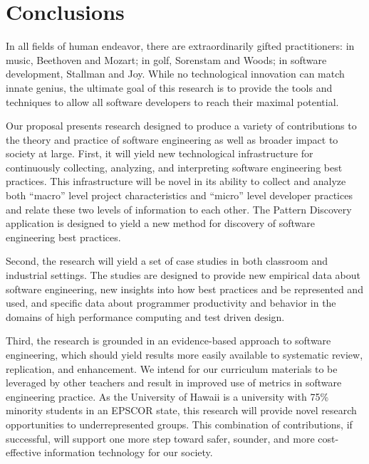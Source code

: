 \section{Conclusions}

In all fields of human endeavor, there are extraordinarily gifted
practitioners: in music, Beethoven and Mozart; in golf, Sorenstam and
Woods; in software development, Stallman and Joy.  While no technological
innovation can match innate genius, the ultimate goal of this research is
to provide the tools and techniques to allow all software developers to
reach their maximal potential.

Our proposal presents research designed to produce a variety of
contributions to the theory and practice of software engineering as well as
broader impact to society at large.  First, it will yield new technological
infrastructure for continuously collecting, analyzing, and interpreting software
engineering best practices.  This infrastructure will be novel in its
ability to collect and analyze both ``macro'' level project characteristics
and ``micro'' level developer practices and relate these two levels of
information to each other.  The Pattern Discovery application is designed
to yield a new method for discovery of software engineering best practices.

Second, the research will yield a set of case studies in both classroom and
industrial settings.  The studies are designed to provide new empirical
data about software engineering, new insights into how best practices and
be represented and used, and specific data about programmer productivity
and behavior in the domains of high performance computing and test driven
design.

Third, the research is grounded in an evidence-based approach to software
engineering, which should yield results more easily available to systematic
review, replication, and enhancement.  We intend for our curriculum
materials to be leveraged by other teachers and result in improved use of
metrics in software engineering practice.  As the University of Hawaii is a
university with 75\% minority students in an EPSCOR state, this research
will provide novel research opportunities to underrepresented groups.  This
combination of contributions, if successful, will support one more
step toward safer, sounder, and more cost-effective information technology
for our society. 










